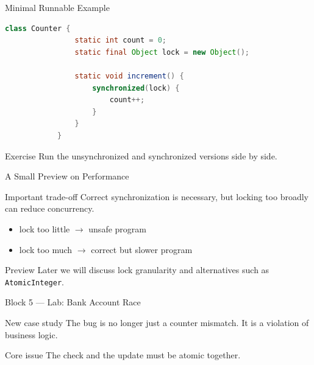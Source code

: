 \documentclass[aspectratio=169,11pt]{beamer}
\begin{document}
	\begin{frame}[fragile]{Minimal Runnable Example}
		\begin{lstlisting}[language=Java]
			class Counter {
				static int count = 0;
				static final Object lock = new Object();
				
				static void increment() {
					synchronized(lock) {
						count++;
					}
				}
			}
		\end{lstlisting}
		
		\vspace{0.2cm}
		\begin{alertblock}{Exercise}
			Run the unsynchronized and synchronized versions side by side.
		\end{alertblock}
	\end{frame}
	
	\begin{frame}{A Small Preview on Performance}
		\begin{block}{Important trade-off}
			Correct synchronization is necessary, but locking too broadly can reduce concurrency.
		\end{block}
		
		\bigskip
		
		\begin{itemize}
			\item lock too little \(\rightarrow\) unsafe program
			\item lock too much \(\rightarrow\) correct but slower program
		\end{itemize}
		
		\bigskip
		
		\begin{alertblock}{Preview}
			Later we will discuss lock granularity and alternatives such as \texttt{AtomicInteger}.
		\end{alertblock}
	\end{frame}
	
	\begin{frame}{Block 5 --- Lab: Bank Account Race}
		\begin{block}{New case study}
			The bug is no longer just a counter mismatch.  
			It is a violation of business logic.
		\end{block}
		
		\bigskip
		
		\begin{alertblock}{Core issue}
			The check and the update must be atomic together.
		\end{alertblock}
	\end{frame}
	
\end{document}
